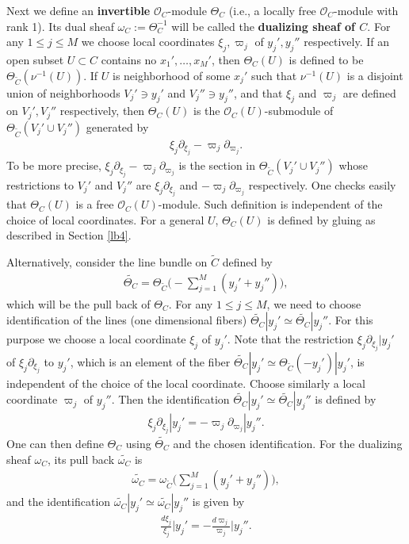 \documentclass[12pt,a4paper,notitlepage]{report}
\theoremstyle{definition}
\theoremstyle{plain}
\newcommand{\wtd}{\widetilde}
\newcommand{\scr}{\mathscr}
\numberwithin{equation}{section}
\begin{document}
Next we define an \textbf{invertible} $\scr O_C$-module $\Theta_C$ (i.e., a locally free $\scr O_C$-module with rank 1).    Its dual sheaf $\omega_C:=\Theta_C^{-1}$ will be called the \textbf{dualizing sheaf of $C$}.  For any $1\leq j\leq M$ we choose local coordinates $\xi_j,\varpi_j$ of $y_j',y_j''$ respectively. If an open subset $U\subset C$ contains no $x_1',\dots,x_M'$, then $\Theta_C(U)$ is defined to be $\Theta_{\wtd C}(\nu^{-1}(U))$. If $U$ is  neighborhood of some $x_j'$ such that $\nu^{-1}(U)$ is a disjoint union of neighborhoods $V_j'\ni y_j'$ and $V_j''\ni y_j''$, and that $\xi_j$ and $\varpi_j$ are defined on $V_j',V_j''$ respectively,  then $\Theta_C(U)$ is the $\scr O_C(U)$-submodule of $\Theta_{\wtd C}(V_j'\cup V_j'')$ generated by
\begin{align}
\xi_j\partial_{\xi_j}-\varpi_j\partial_{\varpi_j}.\label{eq57}
\end{align}
To be more precise, $\xi_j\partial_{\xi_j}-\varpi_j\partial_{\varpi_j}$ is the section in $\Theta_{\wtd C}(V_j'\cup V_j'')$ whose restrictions to $V_j'$ and $V_j''$ are $\xi_j\partial_{\xi_j}$ and $-\varpi_j\partial_{\varpi_j}$ respectively. One checks easily that $\Theta_C(U)$ is a free $\scr O_C(U)$-module.  Such definition is independent of the choice of local coordinates. For a general $U$, $\Theta_C(U)$ is defined by gluing as described in Section \ref{lb4}.

Alternatively, consider the line bundle on $\wtd C$ defined by
\begin{align}
\wtd{\Theta_C}=\Theta_{\wtd C}\big(-\sum_{j=1}^M(y_j'+y_j'')\big),\label{eq14}
\end{align}
which will be the pull back of $\Theta_C$. For any $1\leq j\leq M$, we need to choose identification of the lines (one dimensional fibers) $\wtd{\Theta_C}|y_j'\simeq\wtd{\Theta_C}|y_j''$. For this purpose we choose a local coordinate $\xi_j$ of $y_j'$. Note that the restriction $\xi_j\partial_{\xi_j}|y_j'$ of $\xi_j\partial_{\xi_j}$ to $y_j'$, which is an element of the fiber $\wtd{\Theta_C}|y_j'\simeq\Theta_{\wtd C}(-y_j')|y_j'$, is independent of the choice of the local coordinate. Choose similarly a local coordinate $\varpi_j$ of $y_j''$. Then the identification $\wtd{\Theta_C}|y_j'\simeq\wtd{\Theta_C}|y_j''$ is defined by
\begin{align}
\xi_j\partial_{\xi_j}|y_j'= -\varpi_j\partial_{\varpi_j}|y_j''.
\end{align}
One can then define $\Theta_C$ using $\wtd{\Theta_C}$ and the chosen identification. For the dualizing sheaf $\omega_C$, its pull back $\wtd{\omega_C}$ is
\begin{align}
\wtd{\omega_C}=\omega_{\wtd C}\big(\sum_{j=1}^M(y_j'+y_j'')\big),\label{eq218}
\end{align}
and the identification $\wtd{\omega_C}|y_j'\simeq\wtd{\omega_C}|y_j''$ is given by
\begin{align}
\frac{d\xi_j}{\xi_j}\Big|y_j'=-\frac{d\varpi_j}{\varpi_j}\Big|y_j''.\label{eq159}
\end{align}
\end{document}
